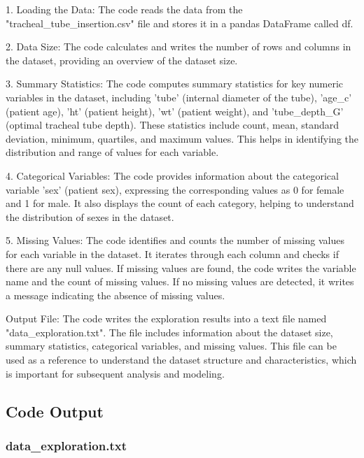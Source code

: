 \documentclass[11pt]{article}
\begin{document}
1. Loading the Data: 
   The code reads the data from the "tracheal\_tube\_insertion.csv" file and stores it in a pandas DataFrame called df.

2. Data Size:
   The code calculates and writes the number of rows and columns in the dataset, providing an overview of the dataset size.

3. Summary Statistics:
   The code computes summary statistics for key numeric variables in the dataset, including 'tube' (internal diameter of the tube), 'age\_c' (patient age), 'ht' (patient height), 'wt' (patient weight), and 'tube\_depth\_G' (optimal tracheal tube depth). These statistics include count, mean, standard deviation, minimum, quartiles, and maximum values. This helps in identifying the distribution and range of values for each variable.

4. Categorical Variables:
   The code provides information about the categorical variable 'sex' (patient sex), expressing the corresponding values as 0 for female and 1 for male. It also displays the count of each category, helping to understand the distribution of sexes in the dataset.

5. Missing Values:
   The code identifies and counts the number of missing values for each variable in the dataset. It iterates through each column and checks if there are any null values. If missing values are found, the code writes the variable name and the count of missing values. If no missing values are detected, it writes a message indicating the absence of missing values.

Output File:
The code writes the exploration results into a text file named "data\_exploration.txt". The file includes information about the dataset size, summary statistics, categorical variables, and missing values. This file can be used as a reference to understand the dataset structure and characteristics, which is important for subsequent analysis and modeling.

\subsection{Code Output}

\subsubsection*{data\_exploration.txt}
\end{document}
